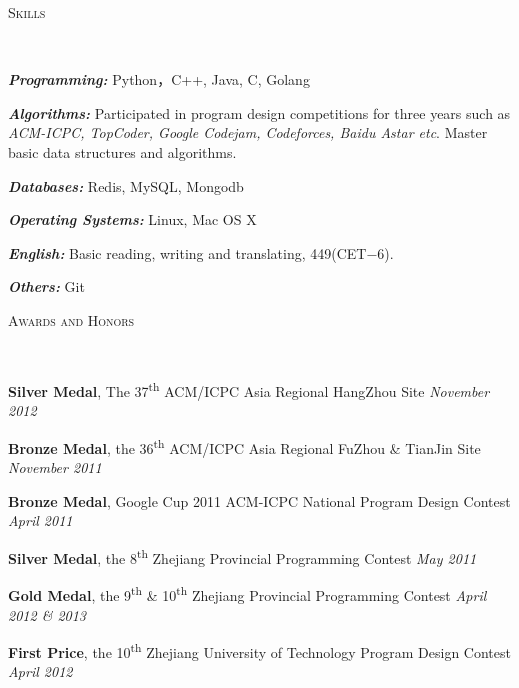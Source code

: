 ﻿\documentclass[9pt]{article}
\newenvironment{changemargin}[2]{%
  \begin{list}{}{%
    \setlength{\topsep}{0pt}%
    \setlength{\leftmargin}{#1}%
    \setlength{\rightmargin}{#2}%
    \setlength{\listparindent}{\parindent}%
    \setlength{\itemindent}{\parindent}%
    \setlength{\parsep}{\parskip}%
  }%
  \item[]}{\end{list}
}
\newcommand{\lineover}{
	\begin{changemargin}{-0.05in}{-0.05in}
		\vspace*{-8pt}
		\hrulefill \\
		\vspace*{-2pt}
	\end{changemargin}
}
\newcommand{\header}[1]{
	\begin{changemargin}{-0.5in}{-0.5in}
		\scshape{#1}\\
  	\lineover
	\end{changemargin}
}
\newenvironment{body} {
	\vspace*{-16pt}
	\begin{changemargin}{-0.25in}{-0.5in}
  }
	{\end{changemargin}
}
\newcommand\nth{\textsuperscript{th}} %
\begin{document}
\smallskip


\header{Skills}

\begin{body}
	\vspace{14pt}
	\emph{\textbf{Programming:}}{} Python，C++, Java, C, Golang \\
	\medskip

    \emph{\textbf{Algorithms:}}{} Participated in program design competitions for three years such as \emph{ACM-ICPC,
TopCoder, Google Codejam, Codeforces, Baidu Astar etc}. Master basic data structures and algorithms.\\
    \medskip

    \emph{\textbf{Databases:}}{} Redis, MySQL, Mongodb \\
    \medskip

    \emph{\textbf{Operating Systems:}}{} Linux, Mac OS X \\
    \medskip

    \emph{\textbf{English:}}{} Basic reading, writing and translating, 449(CET$-$6).\\
    \medskip

    \emph{\textbf{Others:}}{} Git

\end{body}

\smallskip

\header{Awards and Honors}

\begin{body}
	\vspace{14pt}

	\textbf{Silver Medal}, The 37\nth{} ACM/ICPC Asia Regional HangZhou Site \hfill{} \emph{November 2012}\\
	\smallskip

	\textbf{Bronze Medal}, the 36\nth{} ACM/ICPC Asia Regional FuZhou \& TianJin Site \hfill{} \emph{November 2011}\\
	\smallskip

	\textbf{Bronze Medal}, Google Cup 2011 ACM-ICPC National Program Design Contest \hfill{} \emph{April 2011}\\
	\smallskip

	\textbf{Silver Medal}, the 8\nth{} Zhejiang Provincial Programming Contest \hfill{} \emph{May 2011}\\
	\smallskip

	\textbf{Gold Medal}, the 9\nth{} \& 10\nth{} Zhejiang Provincial Programming Contest \hfill{} \emph{April 2012 \& 2013}\\
	\smallskip

	\textbf{First Price}, the 10\nth{} Zhejiang University of Technology Program Design Contest \hfill{} \emph{April 2012}\\
\end{body}
\end{document}
